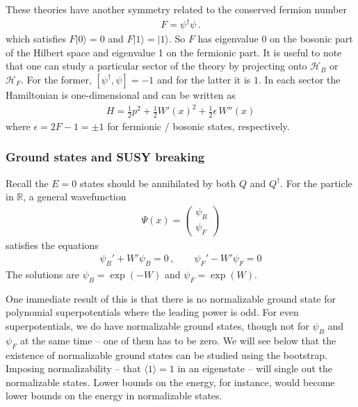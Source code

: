 \documentclass[a4paper,11pt]{article}
\numberwithin{equation}{section}
\begin{document}
These theories have another symmetry related to the conserved fermion number
%
\begin{align}
    F = \psi^\dagger \psi \, .
\end{align}
%
which satisfies $F | 0 \rangle = 0$ and $F |1 \rangle = |1\rangle$. So $F$ has eigenvalue $0$ on the bosonic part of the Hilbert space and eigenvalue 1 on the fermionic part. It is useful to note that one can study a particular sector of the theory by projecting onto $\mathcal H_B$ or $\mathcal{H}_F$. For the former, $[\psi^\dagger, \psi] = -1$ and for the latter it is $1$. In each sector the Hamiltonian is one-dimensional and can be written as 
%
\begin{align}
    H = \frac{1}{2} p^2 + \frac{1}{2} W'(x)^2 + \frac{1}{2} \epsilon \,  W''(x)
    \label{eq:H_eff}
\end{align}
%
where $\epsilon = 2F - 1 = \pm 1$ for fermionic / bosonic states, respectively.

\subsubsection*{Ground states and SUSY breaking}

Recall the $E = 0$ states should be annihilated by both $Q$ and $Q^\dagger$. For the particle in $\mathbb R$, a general wavefunction
%
\begin{align}
    \Psi(x) = \begin{pmatrix}
        \psi_B \\ \psi_F
    \end{pmatrix}
\end{align}
%
satisfies the equations
%
\begin{align}
    \psi_B ' + W' \psi_B = 0 \, ,\qquad \psi_F ' - W' \psi_F = 0
\end{align}
%
The solutions are $\psi_B = \exp(-W)$ and $\psi_F = \exp(W)$. 

One immediate result of this is that there is no normalizable ground state for polynomial superpotentials where the leading power is odd. For even superpotentials, we do have normalizable ground states, though not for $\psi_B$ and $\psi_F$ at the same time -- one of them has to be zero. We will see below that the existence of normalizable ground states can be studied using the bootstrap. Imposing normalizability -- that $\langle 1 \rangle = 1$ in an eigenstate -- will single out the normalizable states. Lower bounds on the energy, for instance, would become lower bounds on the energy in normalizable states.
\end{document}
